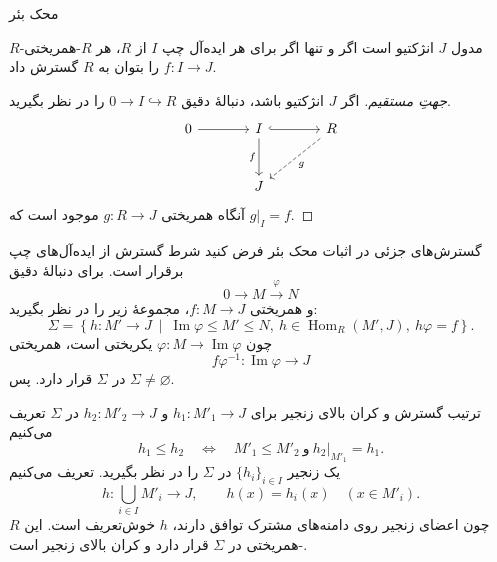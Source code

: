 \begin{frame}[t]{محک بئر}
\label{lec17:baer-criterion}
\begin{theorem}
$R$-مدول $J$ انژکتیو است اگر و تنها اگر برای هر ایده‌آل چپ $I$ از $R$،
هر $R$-همریختی $f:I\to J$ را بتوان به $R$ گسترش داد.
\end{theorem}
\begin{proof}[جهتِ مستقیم]
اگر $J$ انژکتیو باشد، دنبالهٔ دقیق $0\to I\hookrightarrow R$ را در نظر بگیرید.
\[
\begin{tikzcd}[ampersand replacement=\&,column sep=large,row sep=large]
0\arrow[r]\&I\arrow[r,hook]\arrow[d,"f"']\&R\arrow[dl,dashed,"g"]\\
\&J\&
\end{tikzcd}
\]
آنگاه همریختی $g:R\to J$ موجود است که $g|_I=f$.
\end{proof}
\end{frame}

\begin{frame}[t]{گسترش‌های جزئی در اثبات محک بئر}
\label{lec17:baer-partial-extensions}
فرض کنید شرط گسترش از ایده‌آل‌های چپ برقرار است. برای دنبالهٔ دقیق
\[
0\longrightarrow M\xrightarrow{\varphi}N
\]
و همریختی $f:M\to J$، مجموعهٔ زیر را در نظر بگیرید:
\[
\Sigma=\left\{h:M'\to J\ \middle|\
\operatorname{Im}\varphi\le M'\le N,\ h\in\operatorname{Hom}_R(M',J),\ h\varphi=f
\right\}.
\]
چون $\varphi:M\to\operatorname{Im}\varphi$ یکریختی است، همریختی
\[
f\varphi^{-1}:\operatorname{Im}\varphi\longrightarrow J
\]
در $\Sigma$ قرار دارد. پس $\Sigma\ne\varnothing$.
\end{frame}

\begin{frame}[t]{ترتیب گسترش و کران بالای زنجیر}
\label{lec17:baer-chain-upper-bound}
برای $h_1:M'_1\to J$ و $h_2:M'_2\to J$ در $\Sigma$ تعریف می‌کنیم
\[
h_1\le h_2\quad\Longleftrightarrow\quad
M'_1\le M'_2\ \text{و}\ h_2|_{M'_1}=h_1.
\]
یک زنجیر $\{h_i\}_{i\in I}$ در $\Sigma$ را در نظر بگیرید. تعریف می‌کنیم
\[
h:\bigcup_{i\in I}M'_i\longrightarrow J,\qquad
h(x)=h_i(x)\quad(x\in M'_i).
\]
چون اعضای زنجیر روی دامنه‌های مشترک توافق دارند، $h$ خوش‌تعریف است.
این $R$-همریختی در $\Sigma$ قرار دارد و کران بالای زنجیر است.
\end{frame}

